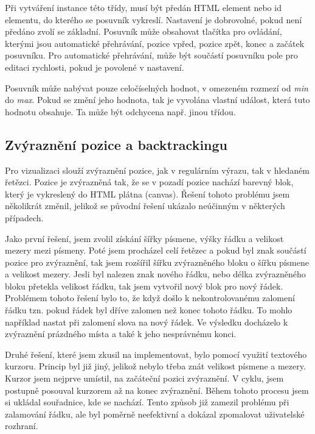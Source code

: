 Při vytváření instance této třídy, musí být předán HTML element nebo id elementu, do kterého se posuvník vykreslí.
Nastavení je dobrovolné, pokud není předáno zvolí se základní.
Posuvník může obsahovat tlačítka pro ovládání, kterými jsou automatické přehrávání, pozice vpřed, pozice zpět, konec a začátek posuvníku.
Pro automatické přehrávání, může být součástí posuvníku pole pro editaci rychlosti, pokud je povolené v nastavení.

Posuvník může nabývat pouze celočíselných hodnot, v omezeném rozmezí od \textit{min} do \textit{max}.
Pokud se změní jeho hodnota, tak je vyvolána vlastní událost, která tuto hodnotu obsahuje.
Ta může být odchycena např. jinou třídou.

\subsection*{Zvýraznění pozice a backtrackingu}

Pro vizualizaci slouží zvýraznění pozice, jak v regulárním výrazu, tak v hledaném řetězci.
Pozice je zvýrazněná tak, že se v pozadí pozice nachází barevný blok, který je vykreslený do HTML plátna (canvas).
Řešení tohoto problému jsem několikrát změnil, jelikož se původní řešení ukázalo neúčinným v některých případech.

Jako první řešení, jsem zvolil získání šířky písmene, výšky řádku a velikost mezery mezi písmeny.
Poté jsem procházel celí řetězec a pokud byl znak součástí pozice pro zvýraznění, tak jsem rozšířil šířku zvýrazněného bloku o šířku písmene a velikost mezery.
Jesli byl nalezen znak nového řádku, nebo délka zvýrazněného bloku přetekla velikost řádku, tak jsem vytvořil nový blok pro nový řádek.
Problémem tohoto řešení bylo to, že když došlo k nekontrolovanému zalomení řádku tzn. pokud řádek byl dříve zalomen než konec tohoto řádku.
To mohlo například nastat při zalomení slova na nový řádek.
Ve výsledku docházelo k zvýraznění prázdného místa a také k jeho nesprávnému konci.

Druhé řešení, které jsem zkusil na implementovat, bylo pomocí využití textového kurzoru.
Princip byl již jiný, jelikož nebylo třeba znát velikost písmene a mezery.
Kurzor jsem nejprve umístil, na začáteční pozici zvýraznění. 
V cyklu, jsem postupně posouval kurzorem až na konec zvýraznění.
Během tohoto procesu jsem si ukládal souřadnice, kde se nachází.
Tento způsob již zamezil problému při zalamování řádku, ale byl poměrně neefektivní a dokázal zpomalovat uživatelské rozhraní.

